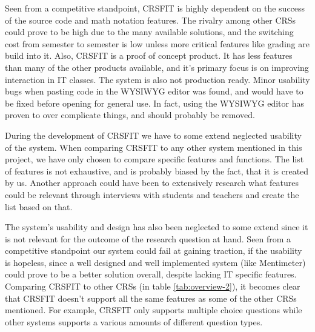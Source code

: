 Seen from a competitive standpoint, CRSFIT is highly dependent on the success of the source code and math notation features. The rivalry among other CRSs could prove to be high due to the many available solutions, and the switching cost from semester to semester is low unless more critical features like grading are build into it. Also, CRSFIT is a proof of concept product. It has less features than many of the other products available, and it's primary focus is on improving interaction in IT classes. The system is also not production ready. Minor usability bugs when pasting code in the WYSIWYG editor was found, and would have to be fixed before opening for general use. In fact, using the WYSIWYG editor has proven to over complicate things, and should probably be removed. %

During the development of CRSFIT we have to some extend neglected usability of the system. When comparing CRSFIT to any other system mentioned in this project, we have only chosen to compare specific features and functions. The list of features is not exhaustive, and is probably biased by the fact, that it is created by us. Another approach could have been to extensively research what features could be relevant through interviews with students and teachers and create the list based on that.

The system's usability and design has also been neglected to some extend since it is not relevant for the outcome of the research question at hand. Seen from a competitive standpoint our system could fail at gaining traction, if the usability is hopeless, since a well designed and well implemented system (like Mentimeter) could prove to be a better solution overall, despite lacking IT specific features. Comparing CRSFIT to other CRSs (in table \ref{tab:overview-2}), it becomes clear that CRSFIT doesn't support all the same features as some of the other CRSs mentioned. For example, CRSFIT only supports multiple choice questions while other systems supports a various amounts of different question types.








